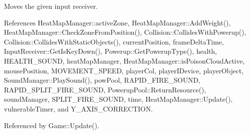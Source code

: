 Moves the given input receiver. 



 

 

References Heat\-Map\-Manager\-::active\-Zone, Heat\-Map\-Manager\-::\-Add\-Weight(), Heat\-Map\-Manager\-::\-Check\-Zone\-From\-Position(), Collision\-::\-Collides\-With\-Powerup(), Collision\-::\-Collides\-With\-Static\-Objects(), current\-Position, frame\-Delta\-Time, Input\-Receiver\-::\-Get\-Is\-Key\-Down(), Powerup\-::\-Get\-Powerup\-Type(), health, H\-E\-A\-L\-T\-H\-\_\-\-S\-O\-U\-N\-D, heat\-Map\-Manager, Heat\-Map\-Manager\-::is\-Poison\-Cloud\-Active, mouse\-Position, M\-O\-V\-E\-M\-E\-N\-T\-\_\-\-S\-P\-E\-E\-D, player\-Col, player\-I\-Device, player\-Object, Sound\-Manager\-::\-Play\-Sound(), pow\-Pool, R\-A\-P\-I\-D\-\_\-\-F\-I\-R\-E\-\_\-\-S\-O\-U\-N\-D, R\-A\-P\-I\-D\-\_\-\-S\-P\-L\-I\-T\-\_\-\-F\-I\-R\-E\-\_\-\-S\-O\-U\-N\-D, Powerup\-Pool\-::\-Return\-Resource(), sound\-Manager, S\-P\-L\-I\-T\-\_\-\-F\-I\-R\-E\-\_\-\-S\-O\-U\-N\-D, time, Heat\-Map\-Manager\-::\-Update(), vulnerable\-Timer, and Y\-\_\-\-A\-X\-I\-S\-\_\-\-C\-O\-R\-R\-E\-C\-T\-I\-O\-N.



Referenced by Game\-::\-Update().


